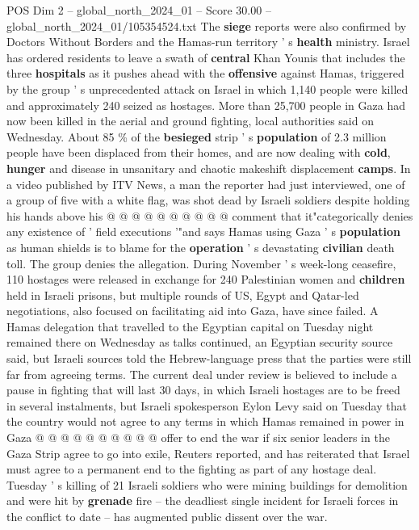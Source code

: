 \begin{textsample}{POS Dim 2 – global\_north\_2024\_01 – Score 30.00 – global\_north\_2024\_01/105354524.txt}
The \textbf{siege} reports were also confirmed by Doctors Without Borders and the Hamas-run territory ' s \textbf{health} ministry.
Israel has ordered residents to leave a swath of \textbf{central} Khan Younis that includes the three \textbf{hospitals} as it pushes ahead with the \textbf{offensive} against Hamas, triggered by the group ' s unprecedented attack on Israel in which 1,140 people were killed and approximately 240 seized as hostages.
More than 25,700 people in Gaza had now been killed in the aerial and ground fighting, local authorities said on Wednesday.
About 85 \% of the \textbf{besieged} strip ' s \textbf{population} of 2.3 million people have been displaced from their homes, and are now dealing with \textbf{cold}, \textbf{hunger} and disease in unsanitary and chaotic makeshift displacement \textbf{camps}.
In a video published by ITV News, a man the reporter had just interviewed, one of a group of five with a white flag, was shot dead by Israeli soldiers despite holding his hands above his @ @ @ @ @ @ @ @ @ @ comment that it"categorically denies any existence of ' field executions '"and says Hamas using Gaza ' s \textbf{population} as human shields is to blame for the \textbf{operation} ' s devastating \textbf{civilian} death toll.
The group denies the allegation.
During November ' s week-long ceasefire, 110 hostages were released in exchange for 240 Palestinian women and \textbf{children} held in Israeli prisons, but multiple rounds of US, Egypt and Qatar-led negotiations, also focused on facilitating aid into Gaza, have since failed.
A Hamas delegation that travelled to the Egyptian capital on Tuesday night remained there on Wednesday as talks continued, an Egyptian security source said, but Israeli sources told the Hebrew-language press that the parties were still far from agreeing terms.
The current deal under review is believed to include a pause in fighting that will last 30 days, in which Israeli hostages are to be freed in several instalments, but Israeli spokesperson Eylon Levy said on Tuesday that the country would not agree to any terms in which Hamas remained in power in Gaza @ @ @ @ @ @ @ @ @ @ offer to end the war if six senior leaders in the Gaza Strip agree to go into exile, Reuters reported, and has reiterated that Israel must agree to a permanent end to the fighting as part of any hostage deal.
Tuesday ' s killing of 21 Israeli soldiers who were mining buildings for demolition and were hit by \textbf{grenade} fire -- the deadliest single incident for Israeli forces in the conflict to date -- has augmented public dissent over the war.

\end{textsample}

